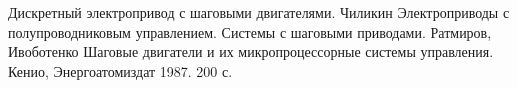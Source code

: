 \begin{thebibliography}{20}
 Дискретный электропривод с шаговыми двигателями. Чиликин
 Электроприводы с полупроводниковым управлением. Системы с шаговыми
приводами. Ратмиров, Ивоботенко
 Шаговые двигатели и их микропроцессорные системы управления. Кенио,
Энергоатомиздат 1987. 200 с.
\end{thebibliography}
